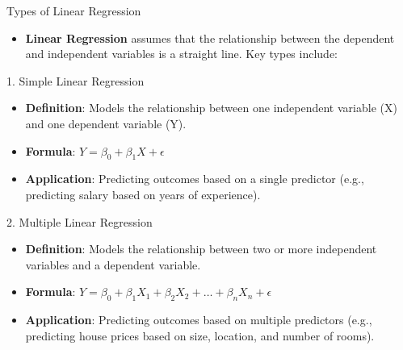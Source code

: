 \documentclass[
  18 pt,
  ignorenonframetext,
  aspectratio=1610,
]{beamer}
\providecommand{\tightlist}{%
  \setlength{\itemsep}{0pt}\setlength{\parskip}{0pt}}\usepackage{longtable,booktabs,array}
\begin{document}
\begin{frame}{Types of Linear Regression}
\protect\hypertarget{types-of-linear-regression}{}
\begin{itemize}
\tightlist
\item
  \textbf{Linear Regression} assumes that the relationship between the
  dependent and independent variables is a straight line. Key types
  include:
\end{itemize}

\scriptsize

\begin{block}{1. Simple Linear Regression}
\protect\hypertarget{simple-linear-regression}{}
\begin{itemize}
\tightlist
\item
  \textbf{Definition}: Models the relationship between one independent
  variable (X) and one dependent variable (Y).
\item
  \textbf{Formula}: \(Y = \beta_0 + \beta_1 X + \epsilon\)
\item
  \textbf{Application}: Predicting outcomes based on a single predictor
  (e.g., predicting salary based on years of experience).
\end{itemize}
\end{block}

\begin{block}{2. Multiple Linear Regression}
\protect\hypertarget{multiple-linear-regression}{}
\begin{itemize}
\tightlist
\item
  \textbf{Definition}: Models the relationship between two or more
  independent variables and a dependent variable.
\item
  \textbf{Formula}:
  \(Y = \beta_0 + \beta_1 X_1 + \beta_2 X_2 + \ldots + \beta_n X_n + \epsilon\)
\item
  \textbf{Application}: Predicting outcomes based on multiple predictors
  (e.g., predicting house prices based on size, location, and number of
  rooms).
\end{itemize}

\normalsize
\end{block}
\end{frame}
\end{document}
